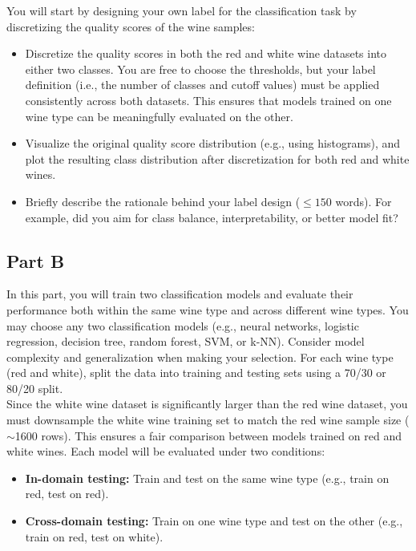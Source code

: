 \documentclass[11pt]{article}
\begin{document}
You will start by designing your own label for the classification task by discretizing the quality scores of the wine samples:

\begin{itemize}
    \item Discretize the quality scores in both the red and white wine datasets into either two classes. You are free to choose the thresholds, but your label definition (i.e., the number of classes and cutoff values) must be applied consistently across both datasets. This ensures that models trained on one wine type can be meaningfully evaluated on the other.
    \item Visualize the original quality score distribution (e.g., using histograms), and plot the resulting class distribution after discretization for both red and white wines.
    \item Briefly describe the rationale behind your label design ($\leq 150$ words). For example, did you aim for class balance, interpretability, or better model fit?
\end{itemize}

\subsection*{Part B}

In this part, you will train two classification models and evaluate their performance both within the same wine type and across different wine types. You may choose any two classification models (e.g., neural networks, logistic regression, decision tree, random forest, SVM, or k-NN). Consider model complexity and generalization when making your selection. For each wine type (red and white), split the data into training and testing sets using a 70/30 or 80/20 split. \\

\noindent Since the white wine dataset is significantly larger than the red wine dataset, you must downsample the white wine training set to match the red wine sample size ($\sim$1600 rows). This ensures a fair comparison between models trained on red and white wines. Each model will be evaluated under two conditions:
\begin{itemize}
    \item \textbf{In-domain testing:} Train and test on the same wine type (e.g., train on red, test on red).
    \item \textbf{Cross-domain testing:} Train on one wine type and test on the other (e.g., train on red, test on white).
\end{itemize}
\end{document}
